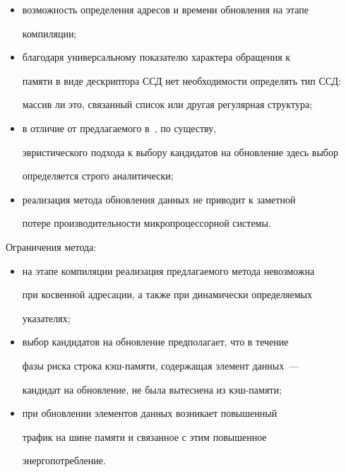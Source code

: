     \begin{itemize}

\item возможность определения адресов и времени обновления на этапе 

компиляции;

\item благодаря универсальному показателю характера обращения к 

памяти в виде дескриптора ССД нет необходимости определять тип ССД: 

массив ли это, связанный список или другая регулярная структура;

\item в отличие от предлагаемого в~\cite{3ss}, по существу, 

эвристического подхода к выбору кандидатов на обновление здесь выбор 

определяется строго аналитически;

\item реализация метода обновления данных не приводит к заметной 

потере производительности микропроцессорной системы. 

\end{itemize}



    Ограничения метода:

    \begin{itemize}

\item на этапе компиляции реализация предлагаемого метода невозможна 

при косвенной адресации, а также при динамически определяемых 

указателях; 

\item выбор кандидатов на обновление предполагает, что в течение 

фазы риска строка кэш-памяти, содержащая элемент данных~--- 

кандидат на обновление, не была вытеснена из кэш-памяти; 

\item при обновлении элементов данных возникает повышенный 

трафик на шине памяти и связанное с этим повышенное 

энергопотребление.

\end{itemize}



